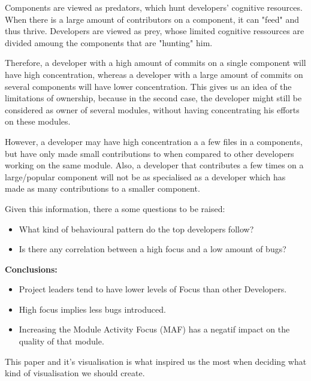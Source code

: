Components are viewed as predators, which hunt developers' cognitive resources. When there is a large amount of contributors on a component, it can "feed" and thus thrive.
Developers are viewed as prey, whose limited cognitive ressources are divided amoung the components that are "hunting" him.

Therefore, a developer with a high amount of commits on a single component will have high concentration, whereas a developer with a large amount of commits on several components will have lower concentration.
This gives us an idea of the limitations of ownership, because in the second case, the developer might still be considered as owner of several modules, without having concentrating his efforts on these modules.

However, a developer may have high concentration a a few files in a components, but have only made small contributions to when compared to other developers working on the same module.
Also, a developer that contributes a few times on a large/popular component will not be as specialised as a developer which has made as many contributions to a smaller component.

Given this information, there a some questions to be raised:
\begin{itemize}
\item What kind of behavioural pattern do the top developers follow?
\item Is there any correlation between a high focus and a low amount of bugs?
\end{itemize}

\textbf{Conclusions:}
\begin{itemize}
\item Project leaders tend to have lower levels of Focus than other Developers.
\item High focus implies less bugs introduced.
\item Increasing the Module Activity Focus (MAF) has a negatif impact on the quality of that module.
\end{itemize}

This paper and it's visualisation is what inspired us the most when deciding what kind of visualisation we should create.